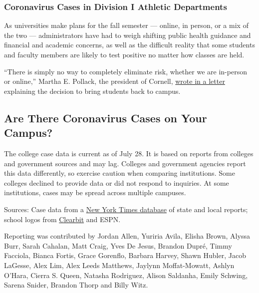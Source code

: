 \hypertarget{coronavirus-cases-in-division-i-athletic-departments}{%
\subsubsection{Coronavirus Cases in Division I Athletic
Departments}\label{coronavirus-cases-in-division-i-athletic-departments}}

As universities make plans for the fall semester --- online, in person,
or a mix of the two --- administrators have had to weigh shifting public
health guidance and financial and academic concerns, as well as the
difficult reality that some students and faculty members are likely to
test positive no matter how classes are held.

``There is simply no way to completely eliminate risk, whether we are
in-person or online,'' Martha E. Pollack, the president of Cornell,
\href{https://covid.cornell.edu/updates/20200630-reactivate-campus.cfm}{wrote
in a letter} explaining the decision to bring students back to campus.

\hypertarget{are-there-coronavirus-cases-on-your-campus}{%
\subsection{Are There Coronavirus Cases on Your
Campus?}\label{are-there-coronavirus-cases-on-your-campus}}

The college case data is current as of July 28. It is based on reports
from colleges and government sources and may lag. Colleges and
government agencies report this data differently, so exercise caution
when comparing institutions. Some colleges declined to provide data or
did not respond to inquiries. At some institutions, cases may be spread
across multiple campuses.

Sources: Case data from a
\href{https://www.nytimes.com/interactive/2020/us/coronavirus-us-cases.html}{New
York Times database} of state and local reports; school logos from
\href{https://clearbit.com}{Clearbit} and ESPN.

Reporting was contributed by Jordan Allen, Yuriria Avila, Elisha Brown,
Alyssa Burr, Sarah Cahalan, Matt Craig, Yves De Jesus, Brandon Dupré,
Timmy Facciola, Bianca Fortis, Grace Gorenflo, Barbara Harvey, Shawn
Hubler, Jacob LaGesse, Alex Lim, Alex Leeds Matthews, Jaylynn
Moffat-Mowatt, Ashlyn O'Hara, Cierra S. Queen, Natasha Rodriguez, Alison
Saldanha, Emily Schwing, Sarena Snider, Brandon Thorp and Billy Witz.

